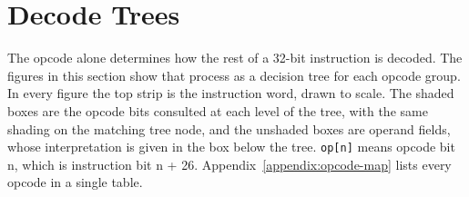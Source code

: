 \section{Decode Trees}
\label{sec:decode-trees}

The opcode alone determines how the rest of a 32-bit instruction is decoded. The figures in this section show that
process as a decision tree for each opcode group. In every figure the top strip is the instruction word, drawn to
scale. The shaded boxes are the opcode bits consulted at each level of the tree, with the same shading on the matching
tree node, and the unshaded boxes are operand fields, whose interpretation is given in the box below the tree.
\texttt{op[n]} means opcode bit n, which is instruction bit n + 26. Appendix~\ref{appendix:opcode-map} lists every
opcode in a single table.

\newcommand{\dtu}{0.46}%


\newcommand{\dtbox}[5]{%
	\draw[fill=#3] ({\dtu*(#1)},0) rectangle ({\dtu*((#1)+(#2))},-0.55);
	\node[font=\footnotesize\ttfamily] at ({\dtu*((#1)+(#2)/2)},-0.275) {#4};
	\node[font=\tiny, text=sircgray] at ({\dtu*((#1)+(#2)/2)},-0.78) {#5};
}

\newcommand{\dtrow}[4]{\texttt{#1} & \opcode{#2} & \mnemonic{#3} & #4\\}
\newcommand{\dtrowx}[4]{\textcolor{sircgray}{\texttt{#1}} & \textcolor{sircgray}{\texttt{0x#2}} & \textcolor{sircgray}{#3} & \textcolor{sircgray}{#4}\\}

\newcommand{\dtsaverows}[2]{%
	\dtrow{000}{#10}{ADD#2}{Add}
	\dtrow{001}{#11}{ADC#2}{Add with carry}
	\dtrow{010}{#12}{SUB#2}{Subtract}
	\dtrow{011}{#13}{SBC#2}{Subtract with carry}
	\dtrow{100}{#14}{AND#2}{AND}
	\dtrow{101}{#15}{ORR#2}{OR}
	\dtrow{110}{#16}{XOR#2}{XOR}%
}
\newcommand{\dttestrows}[2]{%
	\dtrow{000}{#18}{CMN#2}{Compare negative}
	\dtrow{001}{#19}{CNC#2}{Compare negative with carry}
	\dtrow{010}{#1A}{CMP#2}{Compare}
	\dtrow{011}{#1B}{CPC#2}{Compare with carry}
	\dtrow{100}{#1C}{TSA#2}{Test AND}
	\dtrow{101}{#1D}{TSO#2}{Test OR}
	\dtrow{110}{#1E}{TSX#2}{Test XOR}%
}

